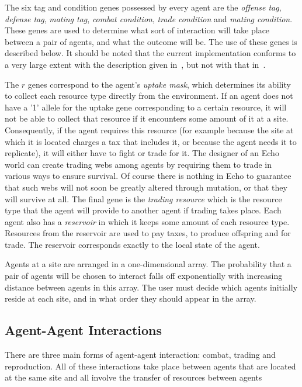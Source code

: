 The six tag and condition genes possessed by every agent are the {\em
offense tag\/}, {\em defense tag\/}, {\em mating tag\/}, {\em combat
condition\/}, {\em trade condition\/} and {\em mating condition\/}.
These genes are used to determine what sort of interaction will take
place between a pair of agents, and what the outcome will be. The use
of these genes is described below. It should be noted that the current
implementation conforms to a very large extent with the description
given in~\cite{Holland92}, but not with that in~\cite{Holland94}.

The $r$ genes correspond to the agent's {\em uptake mask}, which
determines its ability to collect each resource type directly from the
environment. If an agent does not have a '1' allele for the uptake
gene corresponding to a certain resource, it will not be able to
collect that resource if it encounters some amount of it at a
site. Consequently, if the agent requires this resource (for example
because the site at which it is located charges a tax that includes
it, or because the agent needs it to replicate), it will either have
to fight or trade for it. The designer of an Echo world can create
trading webs among agents by requiring them to trade in various ways
to ensure survival. Of course there is nothing in Echo to guarantee
that such webs will not soon be greatly altered through mutation, or
that they will survive at all.
The final gene is the {\em trading resource\/} which is the resource
type that the agent will provide to another agent if trading takes
place.
Each agent also has a {\em reservoir\/} in which it keeps some amount
of each resource type. Resources from the reservoir are used to pay
taxes, to produce offspring and for trade.  The reservoir corresponds
exactly to the local state of the agent.

Agents at a site are arranged in a one-dimensional array. The
probability that a pair of agents will be chosen to interact falls off
exponentially with increasing distance between agents in this
array. The user must decide which agents initially reside at each
site, and in what order they should appear in the array.


\subsection{Agent-Agent Interactions}
\label{agent-agent}

There are three main forms of agent-agent interaction: combat, trading
and reproduction. All of these interactions take place between agents
that are located at the same site and all involve the transfer of
resources between agents

